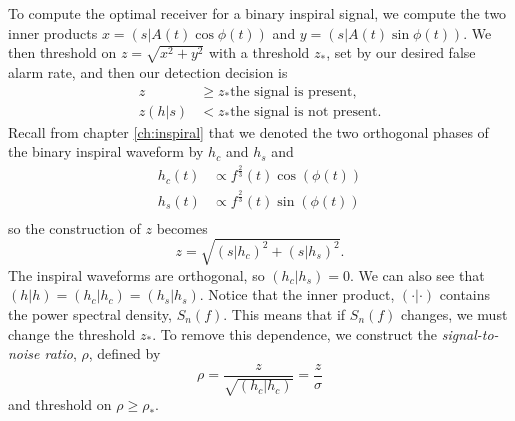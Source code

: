 To compute the optimal receiver for a binary inspiral signal, we compute the
two inner products $x = (s|A(t)\cos\phi(t))$ and $y = (s|A(t)\sin\phi(t))$. We
then threshold on $z = \sqrt{x^2+y^2}$ with a threshold $z_\ast$, set by our
desired false alarm rate, and then our detection decision is
\begin{equation}
\begin{split}
z &\ge z_* \text{the signal is present}, \\
z(h|s) &< z_* \text{the signal is not present}.
\end{split}
\end{equation}
Recall from chapter \ref{ch:inspiral} that we denoted the two orthogonal
phases of the binary inspiral waveform by $h_c$ and $h_s$ and
\begin{align}
h_c(t) &\propto f^\frac{2}{3}(t) \cos(\phi(t)) \\
h_s(t) &\propto f^\frac{2}{3}(t) \sin(\phi(t)) \\
\end{align}
so the construction of $z$ becomes
\begin{equation}
z = \sqrt{(s|h_c)^2 + (s|h_s)^2}.
\end{equation}
The inspiral waveforms are orthogonal, so $(h_c|h_s) = 0$. We can also see
that $(h|h) = (h_c|h_c) = (h_s|h_s)$. Notice that the inner product,
$(\cdot|\cdot)$ contains the power spectral density, $S_n(f)$. This means that
if $S_n(f)$ changes, we must change the threshold $z_\ast$. To remove this
dependence, we construct the \emph{signal-to-noise ratio}, $\rho$, defined by
\begin{equation}
\rho = \frac{z}{\sqrt{(h_c|h_c)}} = \frac{z}{\sigma}
\end{equation}
and threshold on $\rho \ge \rho_\ast$.

